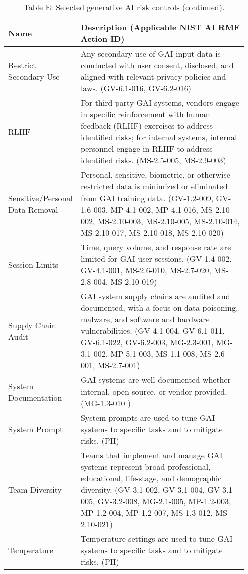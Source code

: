 \documentclass[fleqn]{article}
\begin{document}
\begin{table}[H]
	\caption*{Table E: Selected generative AI risk controls (continued).}
	\label{tab:controls_cont2}
	\footnotesize
	\begin{tabular}{|m{0.25\linewidth} |m{0.70\linewidth} |}
		\hline
		\textbf{Name} & \textbf{Description} (Applicable NIST AI RMF Action ID)\\
		\hline	
		Restrict Secondary Use & Any secondary use of GAI input data is conducted with user consent, disclosed, and aligned with relevant privacy policies and laws. (GV-6.1-016, GV-6.2-016)  \\ 
		\hline	
		RLHF & For third-party GAI systems, vendors engage in specific reinforcement with human feedback (RLHF) exercises to address identified risks; for internal systems, internal personnel engage in RLHF to address identified risks. (MS-2.5-005, MS-2.9-003)  \\ 
		\hline
		Sensitive/Personal Data Removal & Personal, sensitive, biometric, or otherwise restricted data is minimized or eliminated from GAI training data. (GV-1.2-009, GV-1.6-003, MP-4.1-002, MP-4.1-016, MS-2.10-002, MS-2.10-003, MS-2.10-005, MS-2.10-014, MS-2.10-017, MS-2.10-018, MS-2.10-020)  \\ 
		\hline
		Session Limits & Time, query volume, and response rate are limited for GAI user sessions. (GV-1.4-002, GV-4.1-001, MS-2.6-010, MS-2.7-020, MS-2.8-004, MS-2.10-019) \\ 
		\hline
		Supply Chain Audit & GAI system supply chains are audited and documented, with a focus on data poisoning, malware, and software and hardware vulnerabilities. (GV-4.1-004, GV-6.1-011, GV-6.1-022, GV-6.2-003, MG-2.3-001, MG-3.1-002, MP-5.1-003, MS-1.1-008, MS-2.6-001, MS-2.7-001)  \\ 
		\hline
		System Documentation & GAI systems are well-documented whether internal, open source, or vendor-provided. (MG-1.3-010 )  \\ 
		\hline
		System Prompt  & System prompts are used to tune GAI systems to specific tasks and to mitigate risks. (PH)  \\ 
		\hline
		Team Diversity & Teams that implement and manage GAI systems represent broad professional, educational, life-stage, and demographic diversity. (GV-3.1-002, GV-3.1-004, GV-3.1-005, GV-3.2-008, MG-2.1-005, MP-1.2-003, MP-1.2-004, MP-1.2-007, MS-1.3-012, MS-2.10-021)  \\ 
		\hline
		Temperature & Temperature settings are used to tune GAI systems to specific tasks and to mitigate risks. (PH)  \\ 

\end{tabular}
\end{table}
\end{document}
